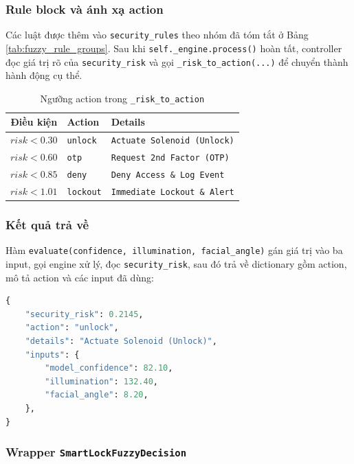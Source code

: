 \subsubsection{Rule block và ánh xạ action}

Các luật được thêm vào \texttt{security\_rules} theo nhóm đã tóm tắt ở Bảng \ref{tab:fuzzy_rule_groups}. Sau khi \texttt{self.\_engine.process()} hoàn tất, controller đọc giá trị rõ của \texttt{security\_risk} và gọi \texttt{\_risk\_to\_action(...)} để chuyển thành hành động cụ thể.

\begin{table}[H]
\centering
\caption{Ngưỡng action trong \texttt{\_risk\_to\_action}}
\label{tab:fuzzy_action_impl}
\begin{tabular}{|c|l|l|}
\hline
\textbf{Điều kiện} & \textbf{Action} & \textbf{Details} \\
\hline
$risk < 0.30$ & \texttt{unlock} & \texttt{Actuate Solenoid (Unlock)} \\
\hline
$risk < 0.60$ & \texttt{otp} & \texttt{Request 2nd Factor (OTP)} \\
\hline
$risk < 0.85$ & \texttt{deny} & \texttt{Deny Access \& Log Event} \\
\hline
$risk < 1.01$ & \texttt{lockout} & \texttt{Immediate Lockout \& Alert} \\
\hline
\end{tabular}
\end{table}

\subsubsection{Kết quả trả về}

Hàm \texttt{evaluate(confidence, illumination, facial\_angle)} gán giá trị vào ba input, gọi engine xử lý, đọc \texttt{security\_risk}, sau đó trả về dictionary gồm action, mô tả action và các input đã dùng:

\begin{lstlisting}[language=Python, caption={Dạng dữ liệu fuzzy decision}]
{
    "security_risk": 0.2145,
    "action": "unlock",
    "details": "Actuate Solenoid (Unlock)",
    "inputs": {
        "model_confidence": 82.10,
        "illumination": 132.40,
        "facial_angle": 8.20,
    },
}
\end{lstlisting}

\subsubsection{Wrapper \texttt{SmartLockFuzzyDecision}}

